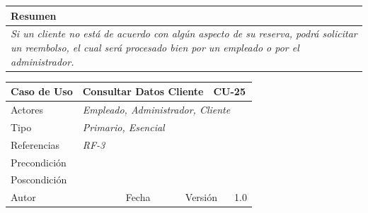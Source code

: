 \begin{table}[H]
\begin{tabular}{|llllllll|}
    \multicolumn{8}{|l|}{\cellcolor[HTML]{F2F2F2}Resumen}                                                                                                                                                                            \\ \hline
    \multicolumn{8}{|p{15cm}|}{{\color[HTML]{808080} \textit{Si un cliente no está de acuerdo con algún aspecto de su reserva, podrá solicitar un reembolso, el cual será procesado bien por un empleado o por el administrador.}}} \\ \hline
    \end{tabular}
\end{table}

\begin{table}[H]
    \begin{tabular}{|llllllll|}
    \hline
    \multicolumn{1}{|l|}{Caso de Uso}       & \multicolumn{5}{l|}{Consultar Datos Cliente}                                                                          & \multicolumn{2}{l|}{\cellcolor[HTML]{E6E6E6}CU-25}          \\ \hline
    \multicolumn{1}{|l|}{Actores}           & \multicolumn{7}{l|}{{\color[HTML]{808080} \textit{Empleado, Administrador, Cliente}}}                                                                                                                           \\ \hline
    \multicolumn{1}{|l|}{Tipo}              & \multicolumn{7}{l|}{{\color[HTML]{808080} \textit{Primario, Esencial}}}                                                                                                                \\ \hline
    \multicolumn{1}{|l|}{Referencias}       & \multicolumn{2}{l|}{{\color[HTML]{808080} \textit{RF-3}}}              & \multicolumn{5}{l|}{}                                                                                       \\ \hline
    \multicolumn{1}{|l|}{Precondición}      & \multicolumn{7}{l|}{}                                                                                                \\ \hline
    \multicolumn{1}{|l|}{Poscondición}      & \multicolumn{7}{l|}{}                                                                                                                                                                  \\ \hline
    \multicolumn{1}{|l|}{Autor}             & \multicolumn{1}{l|}{}                        & \multicolumn{2}{l|}{Fecha}           & \multicolumn{1}{l|}{}     & \multicolumn{2}{l|}{Versión}         & 1.0                           \\ \hline

\end{tabular}
\end{table}
